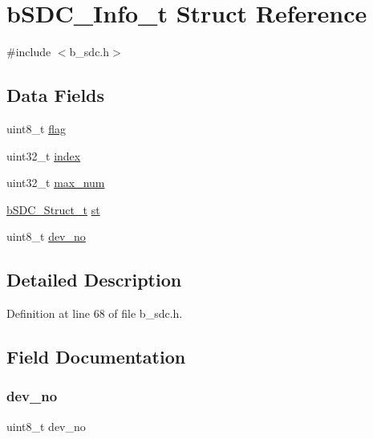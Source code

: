 \hypertarget{structb_s_d_c___info__t}{}\section{b\+S\+D\+C\+\_\+\+Info\+\_\+t Struct Reference}
\label{structb_s_d_c___info__t}


{\ttfamily \#include $<$b\+\_\+sdc.\+h$>$}

\subsection*{Data Fields}
\begin{DoxyCompactItemize}
\item 
uint8\+\_\+t \mbox{\hyperlink{structb_s_d_c___info__t_aff31312fb16705aa73c53b945a1a6b30}{flag}}
\item 
uint32\+\_\+t \mbox{\hyperlink{structb_s_d_c___info__t_aafd95f8c7a99b9189ede7cdf0871ebe8}{index}}
\item 
uint32\+\_\+t \mbox{\hyperlink{structb_s_d_c___info__t_af19e28859aaa7978bb268afed6483c58}{max\+\_\+num}}
\item 
\mbox{\hyperlink{structb_s_d_c___struct__t}{b\+S\+D\+C\+\_\+\+Struct\+\_\+t}} \mbox{\hyperlink{structb_s_d_c___info__t_a206268e780481ebdac4f5a0ece153536}{st}}
\item 
uint8\+\_\+t \mbox{\hyperlink{structb_s_d_c___info__t_a858e2685fb0034acadcd8d48cf6f02b2}{dev\+\_\+no}}
\end{DoxyCompactItemize}


\subsection{Detailed Description}


Definition at line 68 of file b\+\_\+sdc.\+h.



\subsection{Field Documentation}
\mbox{\label{structb_s_d_c___info__t_a858e2685fb0034acadcd8d48cf6f02b2}} 
\subsubsection{\texorpdfstring{dev\+\_\+no}{dev\_no}}
{\footnotesize\ttfamily uint8\+\_\+t dev\+\_\+no}



